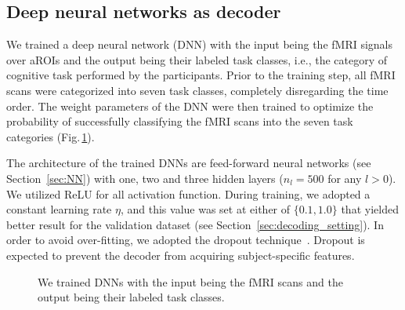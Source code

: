 
\subsection{Deep neural networks as decoder}
\label{sec:dnn_as_decoder}
We trained a deep neural network (DNN) with the input being the fMRI
signals over aROIs and the output being their labeled task classes,
i.e., the category of cognitive task performed by the participants.
%
Prior to the training step, all fMRI scans were categorized into seven
task classes, completely disregarding the time order. The weight
parameters of the DNN were then trained to optimize the probability of
successfully classifying the fMRI scans into the seven task categories
(Fig.\,\ref{fig:dnn}).

The architecture of the trained DNNs are feed-forward neural networks
(see Section~\ref{sec:NN}) with one, two and three hidden layers ($n_l = 500$ for any
$l > 0$).
We utilized ReLU for all activation function.
During training,  we adopted a constant learning rate $\eta$, and this
value was set at either of $\{0.1, 1.0\}$ that yielded better result for
the validation dataset (see Section~\ref{sec:decoding_setting}).
In order to avoid over-fitting, we adopted the dropout technique~\cite{Hinton2012}.
Dropout is expected to prevent the decoder from acquiring subject-specific features.
%
\begin{figure}[thpb]
 \begin{center}
  \caption{\label{fig:dnn}
  We trained DNNs with the input being the fMRI scans and the output being their labeled task classes.}
 \end{center}
\end{figure}
%

